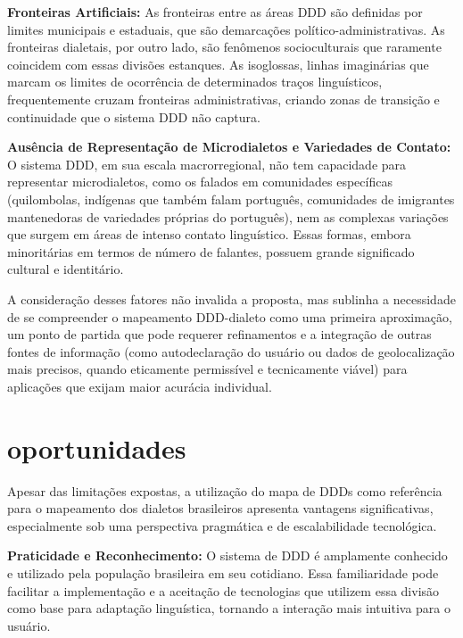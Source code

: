 \textbf{Fronteiras Artificiais:} As fronteiras entre as áreas DDD são definidas por limites municipais e estaduais, que são demarcações político-administrativas. As fronteiras dialetais, por outro lado, são fenômenos socioculturais que raramente coincidem com essas divisões estanques. As isoglossas, linhas imaginárias que marcam os limites de ocorrência de determinados traços linguísticos, frequentemente cruzam fronteiras administrativas, criando zonas de transição e continuidade que o sistema DDD não captura.

\textbf{Ausência de Representação de Microdialetos e Variedades de Contato:} O sistema DDD, em sua escala macrorregional, não tem capacidade para representar microdialetos, como os falados em comunidades específicas (quilombolas, indígenas que também falam português, comunidades de imigrantes mantenedoras de variedades próprias do português), nem as complexas variações que surgem em áreas de intenso contato linguístico. Essas formas, embora minoritárias em termos de número de falantes, possuem grande significado cultural e identitário.

A consideração desses fatores não invalida a proposta, mas sublinha a necessidade de se compreender o mapeamento DDD-dialeto como uma primeira aproximação, um ponto de partida que pode requerer refinamentos e a integração de outras fontes de informação (como autodeclaração do usuário ou dados de geolocalização mais precisos, quando eticamente permissível e tecnicamente viável) para aplicações que exijam maior acurácia individual.










\section{oportunidades}
Apesar das limitações expostas, a utilização do mapa de DDDs como referência para o mapeamento dos dialetos brasileiros apresenta vantagens significativas, especialmente sob uma perspectiva pragmática e de escalabilidade tecnológica.

\textbf{Praticidade e Reconhecimento:} O sistema de DDD é amplamente conhecido e utilizado pela população brasileira em seu cotidiano. Essa familiaridade pode facilitar a implementação e a aceitação de tecnologias que utilizem essa divisão como base para adaptação linguística, tornando a interação mais intuitiva para o usuário.

